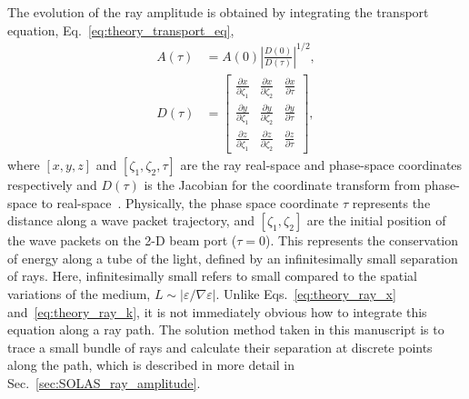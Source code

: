 The evolution of the ray amplitude is obtained by integrating the transport equation, Eq.~\ref{eq:theory_transport_eq},
\begin{align}
    \label{eq:theory_ray_amp}
    A(\tau) &= A(0)\left| \frac{D(0)}{D(\tau)} \right|^{1/2}, \\
    D(\tau) &= 
    \begin{bmatrix}
        \frac{\partial x}{\partial \zeta_1} & \frac{\partial x}{\partial \zeta_2} & \frac{\partial x}{\partial \tau} \\
        \frac{\partial y}{\partial \zeta_1} & \frac{\partial y}{\partial \zeta_2} & \frac{\partial y}{\partial \tau} \\
        \frac{\partial z}{\partial \zeta_1} & \frac{\partial z}{\partial \zeta_2} & \frac{\partial z}{\partial \tau}
    \end{bmatrix},
\end{align}
where $[x,y,z]$ and $[\zeta_1,\zeta_2,\tau]$ are the ray real-space and phase-space coordinates respectively and $D(\tau)$ is the Jacobian for the coordinate transform from phase-space to real-space~\cite{colaitis_inverse_2021}.
Physically, the phase space coordinate $\tau$ represents the distance along a wave packet trajectory, and $[\zeta_1,\zeta_2]$ are the initial position of the wave packets on the 2-D beam port ($\tau=0$).
This represents the conservation of energy along a tube of the light, defined by an infinitesimally small separation of rays.
Here, infinitesimally small refers to small compared to the spatial variations of the medium, $L\sim|\varepsilon/\nabla \varepsilon|$.
Unlike Eqs.~\ref{eq:theory_ray_x} and~\ref{eq:theory_ray_k}, it is not immediately obvious how to integrate this equation along a ray path.
The solution method taken in this manuscript is to trace a small bundle of rays and calculate their separation at discrete points along the path, which is described in more detail in Sec.~\ref{sec:SOLAS_ray_amplitude}.

